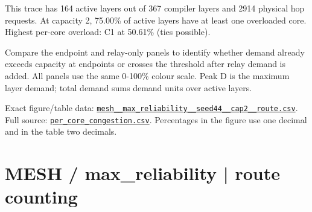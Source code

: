 \documentclass[10pt,a4paper]{article}
\begin{document}
This trace has 164 active layers out of 367 compiler layers and 2914 physical hop requests. At capacity 2, 75.00\% of active layers have at least one overloaded core. Highest per-core overload: C1 at 50.61\% (ties possible).\par
Compare the endpoint and relay-only panels to identify whether demand already exceeds capacity at endpoints or crosses the threshold after relay demand is added. All panels use the same 0-100\% colour scale. Peak D is the maximum layer demand; total demand sums demand units over active layers.\par
Exact figure/table data: \href{\detokenize{file:///home/dhruv-pansuriya/Documents/BTP/Compiler-Driven-ACE/output/pdf/qaoa_methods_congestion/tables/mesh__max_reliability__seed44__cap2__route.csv}}{\nolinkurl{mesh__max_reliability__seed44__cap2__route.csv}}. Full source: \href{\detokenize{file:///home/dhruv-pansuriya/Documents/BTP/Compiler-Driven-ACE/results/qaoa_2seed_2026-10-26/congestion/per_core_congestion.csv}}{\nolinkurl{per_core_congestion.csv}}. Percentages in the figure use one decimal and in the table two decimals.\par
\clearpage
\section*{MESH / max\_reliability | route counting}
\end{document}
